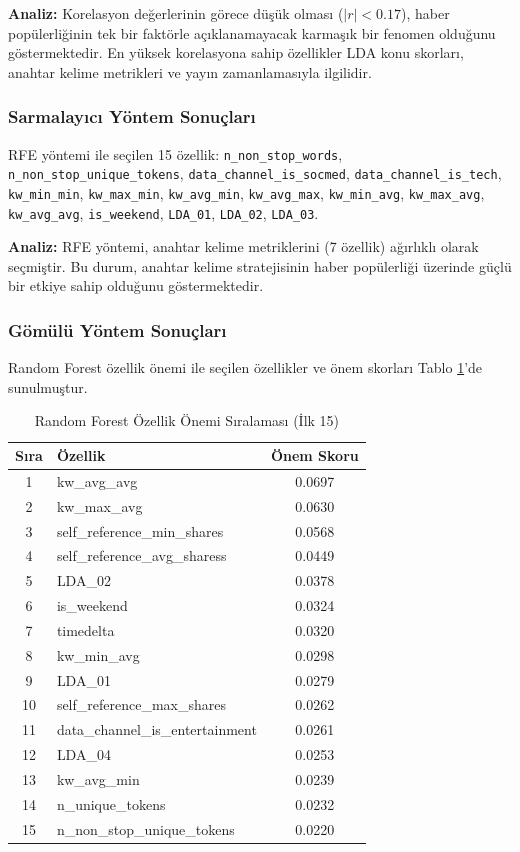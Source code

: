 \documentclass[conference]{IEEEtran}
\begin{document}
\textbf{Analiz:} Korelasyon değerlerinin görece düşük olması ($|r| < 0.17$), haber popülerliğinin tek bir faktörle açıklanamayacak karmaşık bir fenomen olduğunu göstermektedir. En yüksek korelasyona sahip özellikler LDA konu skorları, anahtar kelime metrikleri ve yayın zamanlamasıyla ilgilidir.

\subsubsection{Sarmalayıcı Yöntem Sonuçları}

RFE yöntemi ile seçilen 15 özellik: \texttt{n\_non\_stop\_words}, \texttt{n\_non\_stop\_unique\_tokens}, \texttt{data\_channel\_is\_socmed}, \texttt{data\_channel\_is\_tech}, \texttt{kw\_min\_min}, \texttt{kw\_max\_min}, \texttt{kw\_avg\_min}, \texttt{kw\_avg\_max}, \texttt{kw\_min\_avg}, \texttt{kw\_max\_avg}, \texttt{kw\_avg\_avg}, \texttt{is\_weekend}, \texttt{LDA\_01}, \texttt{LDA\_02}, \texttt{LDA\_03}.

\textbf{Analiz:} RFE yöntemi, anahtar kelime metriklerini (7 özellik) ağırlıklı olarak seçmiştir. Bu durum, anahtar kelime stratejisinin haber popülerliği üzerinde güçlü bir etkiye sahip olduğunu göstermektedir.

\subsubsection{Gömülü Yöntem Sonuçları}

Random Forest özellik önemi ile seçilen özellikler ve önem skorları Tablo \ref{tab:rf_features}'de sunulmuştur.

\begin{table}[H]
\centering
\caption{Random Forest Özellik Önemi Sıralaması (İlk 15)}
\label{tab:rf_features}
\begin{tabular}{clc}
\toprule
\textbf{Sıra} & \textbf{Özellik} & \textbf{Önem Skoru} \\
\midrule
1 & kw\_avg\_avg & 0.0697 \\
2 & kw\_max\_avg & 0.0630 \\
3 & self\_reference\_min\_shares & 0.0568 \\
4 & self\_reference\_avg\_sharess & 0.0449 \\
5 & LDA\_02 & 0.0378 \\
6 & is\_weekend & 0.0324 \\
7 & timedelta & 0.0320 \\
8 & kw\_min\_avg & 0.0298 \\
9 & LDA\_01 & 0.0279 \\
10 & self\_reference\_max\_shares & 0.0262 \\
11 & data\_channel\_is\_entertainment & 0.0261 \\
12 & LDA\_04 & 0.0253 \\
13 & kw\_avg\_min & 0.0239 \\
14 & n\_unique\_tokens & 0.0232 \\
15 & n\_non\_stop\_unique\_tokens & 0.0220 \\
\bottomrule
\end{tabular}
\end{table}
\end{document}
